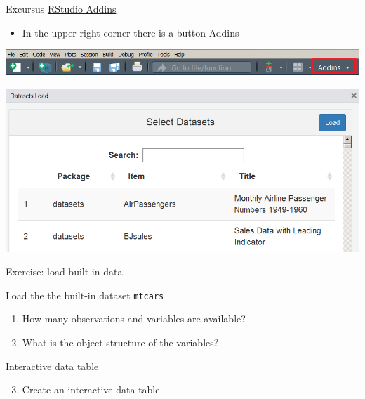 \documentclass[
  10pt,
  ignorenonframetext,
]{beamer}
\providecommand{\tightlist}{%
  \setlength{\itemsep}{0pt}\setlength{\parskip}{0pt}}
\begin{document}
\begin{frame}{Excursus
\href{https://cran.r-project.org/web/packages/addinslist/README.html}{RStudio
Addins}}
\protect\hypertarget{excursus-rstudio-addins}{}

\begin{itemize}
\tightlist
\item
  In the upper right corner there is a button Addins
\end{itemize}

\includegraphics{figure/addins.PNG}

\includegraphics{figure/datasetsload.PNG}

\end{frame}

\begin{frame}[fragile]{Exercise: load built-in data}
\protect\hypertarget{exercise-load-built-in-data}{}

\begin{block}{Load the the built-in dataset \texttt{mtcars}}

\begin{enumerate}
[1)]
\tightlist
\item
  How many observations and variables are available?
\item
  What is the object structure of the variables?
\end{enumerate}

\end{block}

\begin{block}{Interactive data table}

\begin{enumerate}
[1)]
\setcounter{enumi}{2}
\tightlist
\item
  Create an interactive data table
\end{enumerate}

\end{block}

\end{frame}
\end{document}
